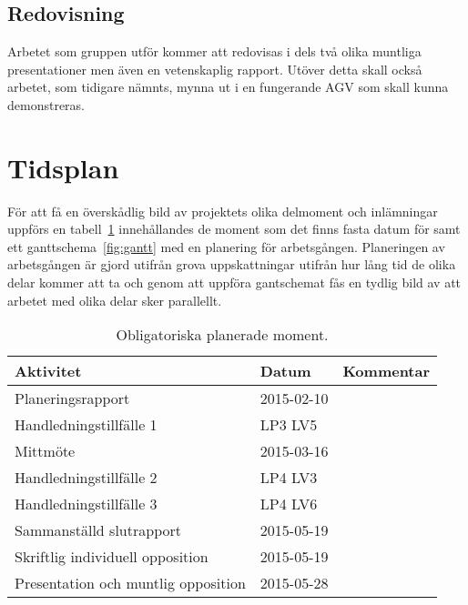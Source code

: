 \documentclass[a4paper,11pt]{article}
\begin{document}
\subsection{Redovisning}
Arbetet som gruppen utför kommer att redovisas i dels två olika muntliga
presentationer men även en vetenskaplig rapport. Utöver detta skall också
arbetet, som tidigare nämnts, mynna ut i en fungerande AGV som skall kunna
demonstreras.




\section{Tidsplan}
För att få en överskådlig bild av projektets olika delmoment och
inlämningar uppförs en tabell~\ref{tab:planeringstabell} innehållandes de
moment som det finns fasta datum för samt ett ganttschema~\ref{fig:gantt}
med en planering för arbetsgången. Planeringen av arbetsgången är gjord
utifrån grova uppskattningar utifrån hur lång tid de olika delar kommer att
ta och genom att uppföra gantschemat fås en tydlig bild av att arbetet med
olika delar sker parallellt. 

\begin{table}[h]
  \begin{center}
    \begin{tabular}{l | l | l }
      Aktivitet                           & Datum      & Kommentar \\ \hline
      Planeringsrapport                   & 2015-02-10 & \\
      Handledningstillfälle 1             & LP3 LV5    & \\
      Mittmöte                            & 2015-03-16 & \\
      Handledningstillfälle 2             & LP4 LV3    & \\
      Handledningstillfälle 3             & LP4 LV6    & \\
      Sammanställd slutrapport            & 2015-05-19 & \\
      Skriftlig individuell opposition    & 2015-05-19 & \\
      Presentation och muntlig opposition & 2015-05-28 & \\
    \end{tabular}
  \end{center}
  \caption{Obligatoriska planerade moment.}
  \label{tab:planeringstabell}
\end{table}
\end{document}

